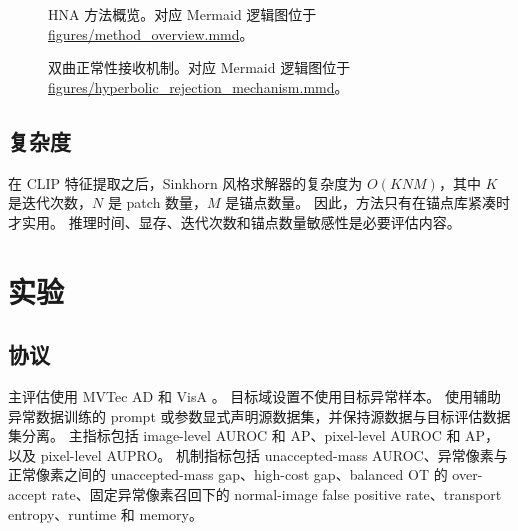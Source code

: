 \documentclass[10pt,fontset=none]{ctexart}
\newcommand{\method}{HNA}
\begin{document}
\begin{figure}[t]
\centering
{}
\caption{\method{} 方法概览。对应 Mermaid 逻辑图位于 \url{figures/method_overview.mmd}。}
\label{fig:overview}
\end{figure}

\begin{figure}[t]
\centering
{}
\caption{双曲正常性接收机制。对应 Mermaid 逻辑图位于 \url{figures/hyperbolic_rejection_mechanism.mmd}。}
\label{fig:mechanism}
\end{figure}

\subsection{复杂度}

在 CLIP 特征提取之后，Sinkhorn 风格求解器的复杂度为 $O(KNM)$，其中 $K$ 是迭代次数，$N$ 是 patch 数量，$M$ 是锚点数量。
因此，方法只有在锚点库紧凑时才实用。
推理时间、显存、迭代次数和锚点数量敏感性是必要评估内容。

\section{实验}

\subsection{协议}

主评估使用 MVTec AD 和 VisA \cite{bergmann2019mvtec,zou2022visa}。
目标域设置不使用目标异常样本。
使用辅助异常数据训练的 prompt 或参数显式声明源数据集，并保持源数据与目标评估数据集分离。
主指标包括 image-level AUROC 和 AP、pixel-level AUROC 和 AP，以及 pixel-level AUPRO。
机制指标包括 unaccepted-mass AUROC、异常像素与正常像素之间的 unaccepted-mass gap、high-cost gap、balanced OT 的 over-accept rate、固定异常像素召回下的 normal-image false positive rate、transport entropy、runtime 和 memory。
\end{document}
